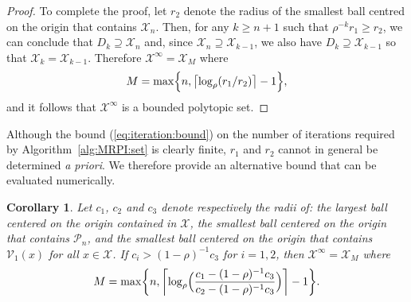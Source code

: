 \documentclass[journal]{IEEEtran}
\newcommand{\todo}[2]{%
  \providetoggle{#1}%
    \iftoggle{#1}{%
    {\color{red}#2}%
    }{#2}%
}
\newcounter{thmcount}
\newtheorem{cor}[thmcount]{Corollary}
\theoremstyle{remark}
\theoremstyle{definition}
\begin{document}
\begin{proof}
To complete the proof, let $r_2$ denote the radius of the smallest ball centred on the origin that contains $\mathcal X_n$.
%
Then, for any $k\geq n+1$ such that 
$\rho^{-k} r_1 \geq r_2$, 
we can conclude that $D_k\supseteq \mathcal X_n$ and, since $\mathcal X_n \supseteq \mathcal X_{k-1}$, we also have $D_k\supseteq \mathcal X_{k-1}$ so that 
$\mathcal X_k = \mathcal{X}_{k-1}$.
%
Therefore $\mathcal X^\infty = \mathcal X_M$ where
\begin{equation}\label{eq:iteration:bound}
M = \max \Bigl\{ n , \todo{Mark:log:bounds}{\bigl\lceil 
\log_{\rho}(r_1/r_2)\bigr\rceil -1}\Bigr\},
\end{equation}
and it follows that $\mathcal{X}^\infty$ is a bounded polytopic set.
\end{proof}
%

Although the bound (\ref{eq:iteration:bound}) on the number of iterations required by Algorithm~\ref{alg:MRPI:set} is clearly finite, $r_1$ and $r_2$ cannot in general be determined \textit{a priori}. 
%
We therefore provide an alternative bound that can be evaluated numerically. 

\begin{cor}
Let $c_1$, $c_2$ and $c_3$ denote respectively the radii of: %
the largest ball centered on the origin contained in $\mathcal{X}$, 
%
the smallest ball centered on the origin that contains $\mathcal{P}_n$, and
%
the smallest ball centered on the origin that contains $\mathcal{V}_1(x)$ for all $x\in\mathcal{X}$.
%
If $c_i > (1-\rho)^{-1}c_3$ for $i=1,2$, then $\mathcal X^\infty = \mathcal X_M$ where
\begin{equation}\label{eq:iteration:cbound}
M = \max \biggl\{ n , 
\todo{Mark:log:bounds}{
\biggl\lceil \log_{\rho}\Bigl(\frac{c_1-(1-\rho)^{-1}c_3}{c_2-(1-\rho)^{-1}c_3}\Bigr)\biggr\rceil -1 \biggr\}}.
\end{equation}
\end{cor}
%
\end{document}
